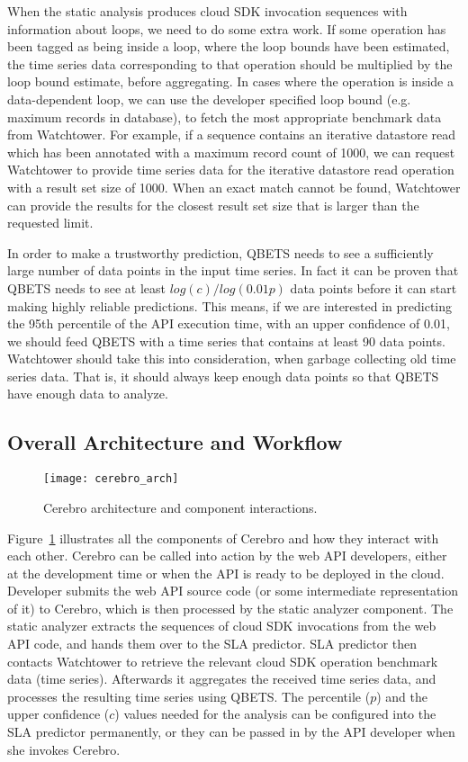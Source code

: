 When the static analysis produces cloud SDK invocation sequences with information about loops, we 
need to do some extra work. If some operation has been tagged as being inside a loop, where the loop
bounds have been estimated, the time series data corresponding to that operation should be multiplied 
by the loop bound estimate, before aggregating. In cases where the operation is inside a data-dependent
loop, we can use the developer specified loop bound (e.g. maximum records
in database), to fetch the most appropriate benchmark data from Watchtower.
For example, if a sequence contains an iterative datastore read which has been annotated with a maximum
record count of 1000, we can request Watchtower to provide time series data for the iterative datastore
read operation with a result set size of 1000. When an exact match cannot be found, Watchtower can
provide the results for the closest result set size that is larger than the requested limit.

In order to make a trustworthy prediction, QBETS needs to see a sufficiently large number of data points
in the input time series. In fact it can be proven that QBETS needs to see at least $log(c)/log(0.01p)$ data points
before it can start making highly reliable predictions. This means, if we are interested in predicting the 95th percentile
of the API execution time, with an upper confidence of 0.01, we should feed QBETS with a time series that
contains at least 90 data points. Watchtower should take this into consideration, when garbage collecting old
time series data. That is, it should always keep enough data points so that QBETS have enough data to analyze.

\subsection{Overall Architecture and Workflow}

\begin{figure}
\centering
\texttt{[image: cerebro\_arch]}
\caption{Cerebro architecture and component interactions.}
\label{fig:cerebro_arch}
\end{figure}

Figure~\ref{fig:cerebro_arch} illustrates all the components of Cerebro and how they interact with each other. 
Cerebro can be called into action by the web API developers, either at the development time or when the
API is ready to be deployed in the cloud. Developer submits the web API source code (or some intermediate
representation of it) to Cerebro, which is then processed by the static analyzer component. The static
analyzer extracts the sequences of cloud SDK invocations from the web API code, and hands them over
to the SLA predictor. SLA predictor then contacts Watchtower to retrieve the relevant cloud SDK operation
benchmark data (time series). Afterwards it aggregates the received time series data, and processes
the resulting time series using QBETS. The percentile ($p$) and the upper confidence ($c$) values needed
for the analysis can be configured into the SLA predictor permanently, or they can be passed in by the API
developer when she invokes Cerebro. 

